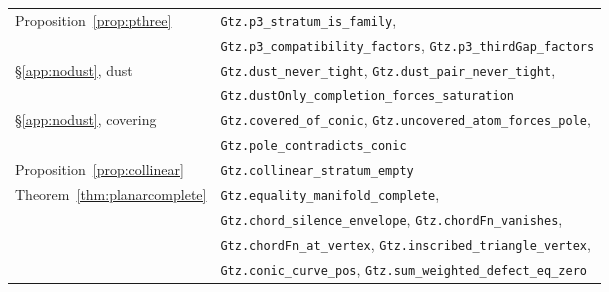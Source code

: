 {\begin{longtable}{@{}ll@{}}
Proposition~\ref{prop:pthree}  & \texttt{Gtz.p3\_stratum\_is\_family}, \\
                               & \texttt{Gtz.p3\_compatibility\_factors},
                                 \texttt{Gtz.p3\_thirdGap\_factors} \\
\S\ref{app:nodust}, dust       & \texttt{Gtz.dust\_never\_tight},
                                 \texttt{Gtz.dust\_pair\_never\_tight}, \\
                               & \texttt{Gtz.dustOnly\_completion\_forces\_saturation} \\
\S\ref{app:nodust}, covering   & \texttt{Gtz.covered\_of\_conic},
                                 \texttt{Gtz.uncovered\_atom\_forces\_pole}, \\
                               & \texttt{Gtz.pole\_contradicts\_conic} \\
Proposition~\ref{prop:collinear}& \texttt{Gtz.collinear\_stratum\_empty} \\
Theorem~\ref{thm:planarcomplete}
                               & \texttt{Gtz.equality\_manifold\_complete}, \\
                               & \texttt{Gtz.chord\_silence\_envelope},
                                 \texttt{Gtz.chordFn\_vanishes}, \\
                               & \texttt{Gtz.chordFn\_at\_vertex},
                                 \texttt{Gtz.inscribed\_triangle\_vertex}, \\
                               & \texttt{Gtz.conic\_curve\_pos},
                                 \texttt{Gtz.sum\_weighted\_defect\_eq\_zero}
\end{longtable}}
